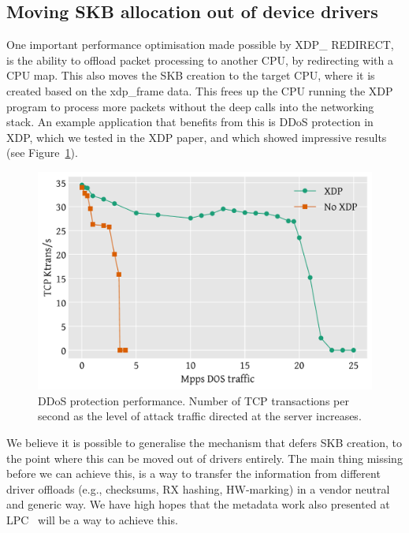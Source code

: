 \documentclass[sigconf]{acmart}
\begin{document}
\subsection{Moving SKB allocation out of device drivers}
\label{sec:moving-skb-alloc}

One important performance optimisation made possible by XDP\_ REDIRECT, is the
ability to offload packet processing to another CPU, by redirecting with a CPU
map. This also moves the SKB creation to the target CPU, where it is created
based on the xdp\_frame data. This frees up the CPU running the XDP program to
process more packets without the deep calls into the networking stack. An
example application that benefits from this is DDoS protection in XDP, which we
tested in the XDP paper, and which showed impressive results (see
Figure~\ref{fig:ddos-results}).

\begin{figure}[t]
\centering
\includegraphics[width=\linewidth]{images/ddos-test.pdf}
\caption{\label{fig:ddos-results} DDoS protection performance. Number of TCP
  transactions per second as the level of attack traffic directed at the server
  increases.}
\end{figure}

We believe it is possible to generalise the mechanism that defers SKB creation,
to the point where this can be moved out of drivers entirely. The main thing
missing before we can achieve this, is a way to transfer the information from
different driver offloads (e.g., checksums, RX hashing, HW-marking) in a vendor
neutral and generic way. We have high hopes that the metadata work also
presented at LPC~\cite{xdp-metadata} will be a way to achieve this.
\end{document}
